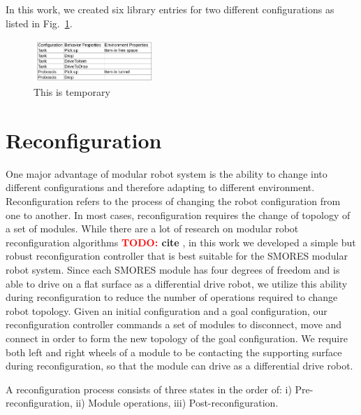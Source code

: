 \documentclass[conference]{IEEEtran}
\newcommand{\TODO}[1]{ {\bf \textcolor{red}{TODO:} #1 }}
\begin{document}
In this work, we created six library entries for two different configurations as listed in Fig.~\ref{fig:library}.
\begin{figure}
\begin{center}
\includegraphics[width=0.4\textwidth]{images/library.png}
\caption{This is temporary}
\label{fig:library}
\end{center}
\end{figure}
\section{Reconfiguration}
\label{sec:reconfiguration}
%
One major advantage of modular robot system is the ability to change into different configurations and therefore adapting to different environment.
Reconfiguration refers to the process of changing the robot configuration from one to another.
In most cases, reconfiguration requires the change of topology of a set of modules.
While there are a lot of research on modular robot reconfiguration algorithms \TODO{cite}, in this work we developed a simple but robust reconfiguration controller that is best suitable for the SMORES modular robot system.
Since each SMORES module has four degrees of freedom and is able to drive on a flat surface as a differential drive robot, we utilize this ability during reconfiguration to reduce the number of operations required to change robot topology.
Given an initial configuration and a goal configuration, our reconfiguration controller commands a set of modules to disconnect, move and connect in order to form the new topology of the goal configuration.
We require both left and right wheels of a module to be contacting the supporting surface during reconfiguration, so that the module can drive as a differential drive robot.

A reconfiguration process consists of three states in the order of: i) Pre-reconfiguration, ii) Module operations, iii) Post-reconfiguration.
\end{document}
